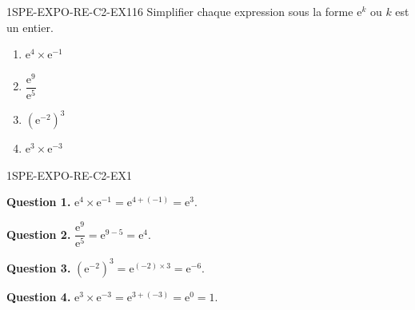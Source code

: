 


\begin{exercice}{1SPE-EXPO-RE-C2-EX1}{1}{6}
Simplifier chaque expression sous la forme $\mathrm{e}^k$ ou $k$ est un entier.
\begin{enumerate}
  \item $\mathrm{e}^4 \times \mathrm{e}^{-1}$
  \item $\dfrac{\mathrm{e}^9}{\mathrm{e}^5}$
  \item $\left(\mathrm{e}^{-2}\right)^3$
  \item $\mathrm{e}^3 \times \mathrm{e}^{-3}$
\end{enumerate}
\end{exercice}


\begin{corrige}{1SPE-EXPO-RE-C2-EX1}


\textbf{Question 1.} $\mathrm{e}^4 \times \mathrm{e}^{-1} = \mathrm{e}^{4+(-1)} = \mathrm{e}^3$.


\textbf{Question 2.} $\dfrac{\mathrm{e}^9}{\mathrm{e}^5} = \mathrm{e}^{9-5} = \mathrm{e}^4$.


\textbf{Question 3.} $\left(\mathrm{e}^{-2}\right)^3 = \mathrm{e}^{(-2) \times 3} = \mathrm{e}^{-6}$.

\textbf{Question 4.} $\mathrm{e}^3 \times \mathrm{e}^{-3} = \mathrm{e}^{3+(-3)} = \mathrm{e}^0 = 1$.

\end{corrige}

